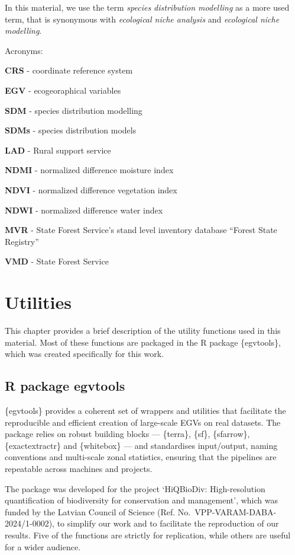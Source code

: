 \documentclass[
]{book}
\begin{document}
In this material, we use the term \emph{species distribution modelling} as a more used term, that
is synonymous with \emph{ecological niche analysis} and \emph{ecological niche modelling}.

Acronyms:

\textbf{CRS} - coordinate reference system

\textbf{EGV} - ecogeoraphical variables

\textbf{SDM} - species distribution modelling

\textbf{SDMs} - species distribution models

\textbf{LAD} - Rural support service

\textbf{NDMI} - normalized difference moisture index

\textbf{NDVI} - normalized difference vegetation index

\textbf{NDWI} - normalized difference water index

\textbf{MVR} - State Forest Service's stand level inventory database ``Forest State Registry''

\textbf{VMD} - State Forest Service

\chapter{Utilities}\label{Ch02}

This chapter provides a brief description of the utility functions used in this
material. Most of these functions are packaged in the R package \{egvtools\}, which
was created specifically for this work.

\section{R package egvtools}\label{Ch02.01}

\{egvtools\} provides a coherent set of wrappers and utilities that facilitate the
reproducible and efficient creation of large-scale EGVs on real datasets. The
package relies on robust building blocks --- \{terra\}, \{sf\}, \{sfarrow\}, \{exactextractr\}
and \{whitebox\} --- and standardises input/output, naming conventions and multi-scale
zonal statistics, ensuring that the pipelines are repeatable across machines and
projects.

The package was developed for the project `HiQBioDiv: High-resolution
quantification of biodiversity for conservation and management', which was
funded by the Latvian Council of Science (Ref. No.~VPP-VARAM-DABA-2024/1-0002),
to simplify our work and to facilitate the reproduction of our results. Five of
the functions are strictly for replication, while others are useful for a wider
audience.
\end{document}

